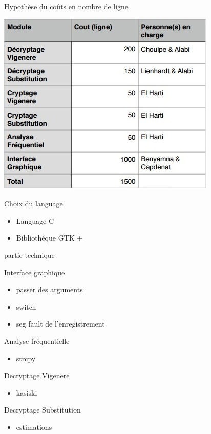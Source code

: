 \documentclass[10pt,xcolor=table]{beamer}
\begin{document}
\begin{frame}
	\begin{block}{Hypothèse du coûts en nombre de ligne}
	\begin{center}
		\includegraphics[scale =0.5]{Tableau_cout.jpg} \\ \pause
	\end{center}
	\end{block}
	\begin{block}{Choix du language}
	\begin{itemize}
		\item Language C \\ \pause
		\item Bibliothéque GTK +
	\end{itemize}
	\end{block}
\end{frame}
\begin{frame}
	partie technique
	\begin{block}{Interface graphique}
	\begin{itemize}
		\item passer des arguments\\ \pause
		\item switch\\ \pause
		\item seg fault de l'enregistrement
	\end{itemize}
	\end{block}
	\begin{block}{Analyse fréquentielle}
	\begin{itemize}
		\item strcpy \pause
	\end{itemize}
	\end{block}
	\begin{block}{Decryptage Vigenere}
	\begin{itemize}
		\item kasiski\\ \pause
	\end{itemize}
	\end{block}
	\begin{block}{Decryptage Substitution}
	\begin{itemize}
		\item estimations\\ \pause
	\end{itemize}
	\end{block}
\end{frame}
\end{document}
